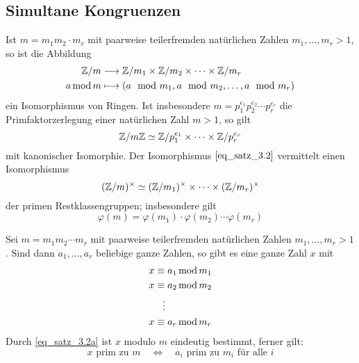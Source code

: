 \subsection{Simultane Kongruenzen}
\begin{satz} \label{satz_3.2}
	Ist $m = m_1 m_2 \cdot m_r$ mit paarweise teilerfremden natürlichen Zahlen $m_1,\dots,m_r > 1$, so ist die Abbildung 
	\begin{equation}
	\begin{aligned}
		\mathbb{Z}/m &\longrightarrow \mathbb{Z}/m_1 \times \mathbb{Z}/m_2 \times \cdots \times \mathbb{Z}/m_r \\
		a \operatorname{mod} m &\longmapsto (a \mod m_1, a \mod m_2, \dots, a \mod m_r)	\label{eq_satz_3.2}
	\end{aligned}
	\end{equation}
	ein Isomorphismus von Ringen. Ist insbesondere $m = p_1^{e_1} p_2^{e_2} \cdots p_r^{e_r}$ die Primfaktorzerlegung einer natürlichen Zahl $m > 1$, so gilt
	\[ \mathbb{Z}/m\mathbb{Z} \simeq \mathbb{Z}/p_1^{e_1} \times \cdots \times \mathbb{Z}/p_r^{e_r} \]
	mit kanonischer Isomorphie. Der Isomorphismus $\eqref{eq_satz_3.2}$ vermittelt einen Isomorphismus
	\[ (\mathbb{Z}/m)^\times \simeq (\mathbb{Z}/m_1)^\times \times \dots \times (\mathbb{Z}/m_r)^\times \]
	der primen Restklassengruppen; insbesondere gilt
	\[ \varphi(m) = \varphi(m_1) \cdot \varphi(m_2) \cdots \varphi(m_r) \]
\end{satz}

\setcounter{countsatz}{1}
\begin{satz} \label{satz_3.2a}
	Sei $m = m_1m_2 \cdots m_r$ mit paarweise teilerfremden natürlichen Zahlen $m_1,\dots,m_r > 1$. Sind dann $a_1,\dots,a_r$ beliebige ganze Zahlen, so gibt es eine ganze Zahl $x$ mit  
	\begin{equation}
	\begin{aligned}
		x &\equiv a_1 \operatorname{mod} m_1 \\
		x &\equiv a_2 \operatorname{mod} m_2 \\
		&\ \ \vdots \\
		x &\equiv a_r \operatorname{mod} m_r \label{eq_satz_3.2a}
	\end{aligned}
	\end{equation}
	Durch \eqref{eq_satz_3.2a} ist $x$ modulo $m$ eindeutig bestimmt, ferner gilt:
	\[ x \text{ prim zu } m \quad \Leftrightarrow \quad a_i \text{ prim zu } m_i \text{ für alle } i \]
\end{satz}

